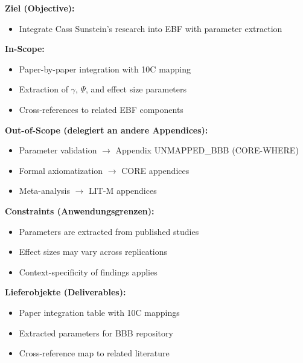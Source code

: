 
\begin{tcolorbox}[
    colback=orange!5!white,
    colframe=orange!75!black,
    title={\textbf{Appendix Scope: Ziel / In-Scope / Out-of-Scope / Constraints}},
    fonttitle=\bfseries
]

\textbf{Ziel (Objective):}
\begin{itemize}[nosep]
    \item Integrate Cass Sunstein's research into EBF with parameter extraction
\end{itemize}

\textbf{In-Scope:}
\begin{itemize}[nosep]
    \item Paper-by-paper integration with 10C mapping
    \item Extraction of $\gamma$, $\Psi$, and effect size parameters
    \item Cross-references to related EBF components
\end{itemize}

\textbf{Out-of-Scope (delegiert an andere Appendices):}
\begin{itemize}[nosep]
    \item Parameter validation $\rightarrow$ Appendix UNMAPPED_BBB (CORE-WHERE)
    \item Formal axiomatization $\rightarrow$ CORE appendices
    \item Meta-analysis $\rightarrow$ LIT-M appendices
\end{itemize}

\textbf{Constraints (Anwendungsgrenzen):}
\begin{itemize}[nosep]
    \item Parameters are extracted from published studies
    \item Effect sizes may vary across replications
    \item Context-specificity of findings applies
\end{itemize}

\textbf{Lieferobjekte (Deliverables):}
\begin{itemize}[nosep]
    \item Paper integration table with 10C mappings
    \item Extracted parameters for BBB repository
    \item Cross-reference map to related literature
\end{itemize}

\end{tcolorbox}

